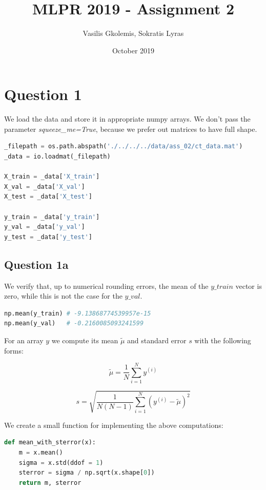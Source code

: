 \documentclass{article}
\title{MLPR 2019 - Assignment 2}
\author{Vasilis Gkolemis, Sokratis Lyras}
\date{October 2019}
\begin{document}
\maketitle

\section*{Question 1}

We load the data and store it in appropriate numpy arrays. We don't pass the parameter \textit{squeeze\_me=True}, because we prefer out matrices to have full shape.

\begin{lstlisting}[language = Python]
_filepath = os.path.abspath('./../../../data/ass_02/ct_data.mat')
_data = io.loadmat(_filepath)

X_train = _data['X_train']
X_val = _data['X_val']
X_test = _data['X_test']

y_train = _data['y_train']
y_val = _data['y_val']
y_test = _data['y_test']
\end{lstlisting}

\subsection*{Question 1a}

We verify that, up to numerical rounding errors, the mean of the $y\_train$ vector is zero, while this is not the case for the $y\_val$.

\begin{lstlisting}[language = Python]
np.mean(y_train) # -9.13868774539957e-15
np.mean(y_val)   # -0.2160085093241599
\end{lstlisting}


For an array $y$ we compute its mean $\tilde{\mu}$ and standard error $s$ with the following forms:

$$ \displaystyle \tilde{\mu} = \frac{1}{N} \sum_{i=1}^{N} y^{(i)} $$

$$ s = \sqrt{\frac{1}{N(N-1)} \sum_{i=1}^{N} (y^{(i)} - \tilde{\mu})^2} $$

We create a small function for implementing the above computations:

\begin{lstlisting}[language = Python]
def mean_with_sterror(x):
    m = x.mean()
    sigma = x.std(ddof = 1)
    sterror = sigma / np.sqrt(x.shape[0])
    return m, sterror
\end{lstlisting}


\end{document}
